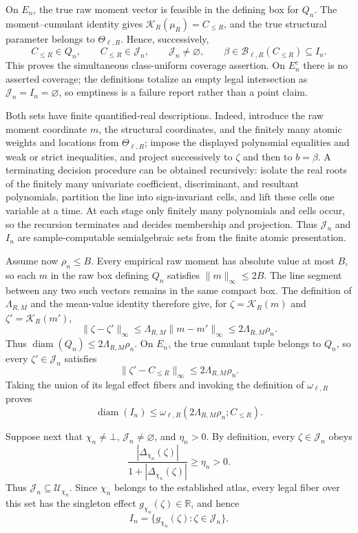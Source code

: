On \(E_n\), the true raw moment vector is feasible in the defining box for \(Q_n\).  The moment--cumulant identity gives \(\mathcal K_R(\mu_R)=C_{\le R}\), and the true structural parameter belongs to \(\Theta_{\ell,R}\).  Hence, successively,
\[
 C_{\le R}\in Q_n,\qquad
 C_{\le R}\in\mathcal J_n,\qquad
 \mathcal J_n\ne\varnothing,\qquad
 \beta\in\mathcal B_{\ell,R}(C_{\le R})\subseteq I_n.
\]
This proves the simultaneous class-uniform coverage assertion.  On \(E_n^c\) there is no asserted coverage; the definitions totalize an empty legal intersection as \(\mathcal J_n=I_n=\varnothing\), so emptiness is a failure report rather than a point claim.

Both sets have finite quantified-real descriptions.  Indeed, introduce the raw moment coordinate \(m\), the structural coordinates, and the finitely many atomic weights and locations from \(\Theta_{\ell,R}\); impose the displayed polynomial equalities and weak or strict inequalities, and project successively to \(\zeta\) and then to \(b=\beta\).  A terminating decision procedure can be obtained recursively: isolate the real roots of the finitely many univariate coefficient, discriminant, and resultant polynomials, partition the line into sign-invariant cells, and lift these cells one variable at a time.  At each stage only finitely many polynomials and cells occur, so the recursion terminates and decides membership and projection.  Thus \(\mathcal J_n\) and \(I_n\) are sample-computable semialgebraic sets from the finite atomic presentation.

Assume now \(\rho_n\le B\).  Every empirical raw moment has absolute value at most \(B\), so each \(m\) in the raw box defining \(Q_n\) satisfies \(\|m\|_\infty\le2B\).  The line segment between any two such vectors remains in the same compact box.  The definition of \(\Lambda_{R,M}\) and the mean-value identity therefore give, for \(\zeta=\mathcal K_R(m)\) and \(\zeta'=\mathcal K_R(m')\),
\[
 \|\zeta-\zeta'\|_\infty
 \le\Lambda_{R,M}\|m-m'\|_\infty
 \le2\Lambda_{R,M}\rho_n.
\]
Thus \(\operatorname{diam}(Q_n)\le2\Lambda_{R,M}\rho_n\).  On \(E_n\), the true cumulant tuple belongs to \(Q_n\), so every \(\zeta'\in\mathcal J_n\) satisfies
\[
 \|\zeta'-C_{\le R}\|_\infty\le2\Lambda_{R,M}\rho_n.
\]
Taking the union of its legal effect fibers and invoking the definition of \(\omega_{\ell,R}\) proves
\[
 \operatorname{diam}(I_n)
 \le\omega_{\ell,R}(2\Lambda_{R,M}\rho_n;C_{\le R}).
\]

Suppose next that \(\chi_n\ne\bot\), \(\mathcal J_n\ne\varnothing\), and \(\eta_n>0\).  By definition, every \(\zeta\in\mathcal J_n\) obeys
\[
 \frac{|\Delta_{\chi_n}(\zeta)|}{1+|\Delta_{\chi_n}(\zeta)|}\ge\eta_n>0.
\]
Thus \(\mathcal J_n\subseteq\mathcal U_{\chi_n}\).  Since \(\chi_n\) belongs to the established atlas, every legal fiber over this set has the singleton effect \(g_{\chi_n}(\zeta)\in\mathbb R\), and hence
\[
 I_n=\{g_{\chi_n}(\zeta):\zeta\in\mathcal J_n\}.
\]

